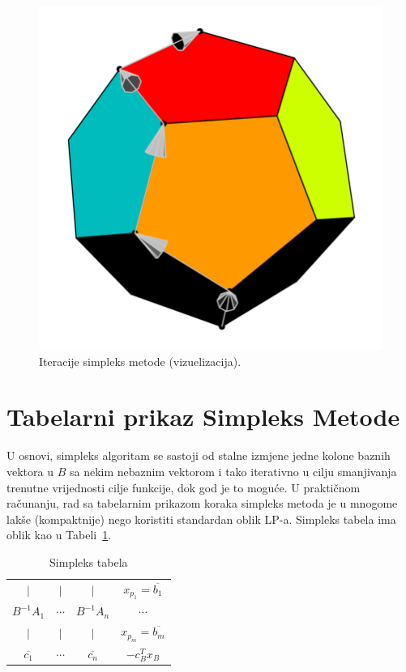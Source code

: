 \documentclass[a4paper, utf8, 11pt, colorlinks]{book}
\begin{document}
\begin{figure}[!ht]
	\centering
   \includegraphics[scale=0.25]{moving_simplex.png}
    \caption{Iteracije simpleks metode (vizuelizacija).}
    \label{fig:simpleks-visuelisation}
\end{figure}

\section{Tabelarni prikaz Simpleks Metode}

U osnovi, simpleks algoritam se sastoji od stalne izmjene jedne kolone baznih vektora u $B$ sa nekim nebaznim vektorom i tako iterativno u cilju smanjivanja trenutne vrijednosti cilje funkcije, dok god je to moguće. 
U praktičnom računanju, rad sa tabelarnim prikazom koraka simpleks metoda je u mnogome lakše (kompaktnije) nego koristiti standardan oblik LP-a. 
Simpleks tabela ima oblik kao u Tabeli~\ref{tab:simplex_tabelau}. 

\begin{table}[!ht]
    \centering
    \begin{tabular}{c c c | c} \\ \hline
            $\mid$          &       $\mid$ &  $\mid$             &    $x_{p_1} = \overline{b_1}$         \\
          $B^{-1}A_1$       &    $\cdots$    &  $B^{-1}A_n$      &    $\cdots$          \\
            $\mid$          &       $\mid$ &  $\mid$             &   $ x_{p_m} = \overline{b_m}$         \\ \hline
          $\overline{c_1}$  &    $\cdots$    & $\overline{c_n}$  &  $-c^T_B x_B$         \\ \hline
    \end{tabular}
    \caption{Simpleks tabela}
    \label{tab:simplex_tabelau}
\end{table}
\end{document}
